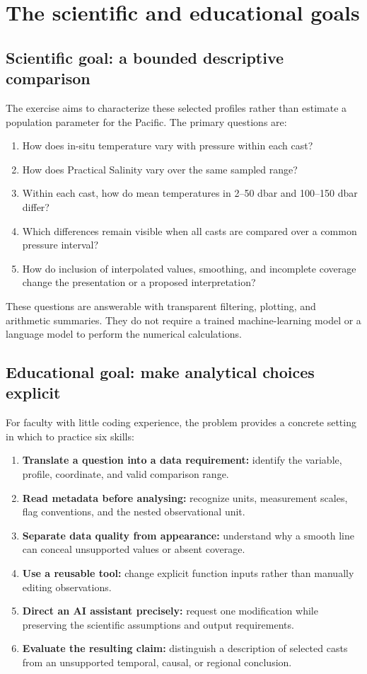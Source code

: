 \documentclass[11pt,letterpaper]{article}
\begin{document}
\section{The scientific and educational goals}
\label{sec:goals}

\subsection{Scientific goal: a bounded descriptive comparison}
The exercise aims to characterize these selected profiles rather than estimate a population parameter for the Pacific. The primary questions are:
\begin{enumerate}
  \item How does in-situ temperature vary with pressure within each cast?
  \item How does Practical Salinity vary over the same sampled range?
  \item Within each cast, how do mean temperatures in 2--50 dbar and 100--150 dbar differ?
  \item Which differences remain visible when all casts are compared over a common pressure interval?
  \item How do inclusion of interpolated values, smoothing, and incomplete coverage change the presentation or a proposed interpretation?
\end{enumerate}
These questions are answerable with transparent filtering, plotting, and arithmetic summaries. They do not require a trained machine-learning model or a language model to perform the numerical calculations.

\subsection{Educational goal: make analytical choices explicit}
For faculty with little coding experience, the problem provides a concrete setting in which to practice six skills:
\begin{enumerate}
  \item \textbf{Translate a question into a data requirement:} identify the variable, profile, coordinate, and valid comparison range.
  \item \textbf{Read metadata before analysing:} recognize units, measurement scales, flag conventions, and the nested observational unit.
  \item \textbf{Separate data quality from appearance:} understand why a smooth line can conceal unsupported values or absent coverage.
  \item \textbf{Use a reusable tool:} change explicit function inputs rather than manually editing observations.
  \item \textbf{Direct an AI assistant precisely:} request one modification while preserving the scientific assumptions and output requirements.
  \item \textbf{Evaluate the resulting claim:} distinguish a description of selected casts from an unsupported temporal, causal, or regional conclusion.
\end{enumerate}
\end{document}
